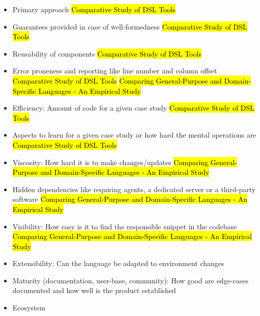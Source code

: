 \begin{itemize}
  \item Primary approach \hl{Comparative Study of DSL Tools}
  \item Guarantees provided in case of well-formedness \hl{Comparative Study of DSL Tools} %
  \item Reusability of components \hl{Comparative Study of DSL Tools}
  \item Error proneness and reporting like line number and column offset \hl{Comparative Study of DSL Tools} \hl{Comparing General-Purpose and Domain-Specific Languages - An Empirical Study}
  \item Efficiency: Amount of code for a given case study \hl{Comparative Study of DSL Tools}
  \item Aspects to learn for a given case study or how hard the mental operations are \hl{Comparative Study of DSL Tools} %
  \item Viscosity: How hard it is to make changes/updates \hl{Comparing General-Purpose and Domain-Specific Languages - An Empirical Study}
  \item Hidden dependencies like requiring agents, a dedicated server or a third-party software \hl{Comparing General-Purpose and Domain-Specific Languages - An Empirical Study}
  \item Visibility: How easy is it to find the responsible snippet in the codebase \hl{Comparing General-Purpose and Domain-Specific Languages - An Empirical Study}
  \item Extensibility: Can the language be adapted to environment changes
  \item Maturity (documentation, user-base, community): How good are edge-cases documented and how well is the product established
  \item Ecosystem
\end{itemize}

